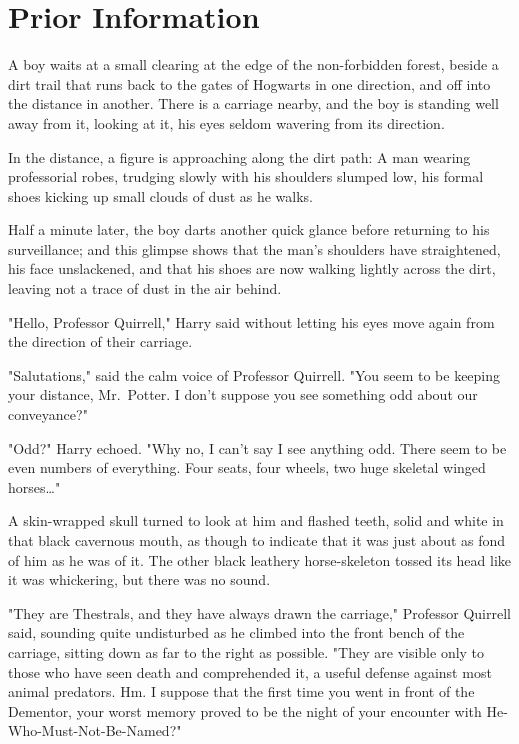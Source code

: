 \chapter{Prior Information}

\lettrine{A}{} boy waits at a
small clearing at the edge of the non-forbidden forest, beside a dirt trail
that runs back to the gates of Hogwarts in one direction, and off into the
distance in another. There is a carriage nearby, and the boy is standing well
away from it, looking at it, his eyes seldom wavering from its direction.

In the distance, a figure is approaching along the dirt path: A man wearing
professorial robes, trudging slowly with his shoulders slumped low, his formal
shoes kicking up small clouds of dust as he walks.

Half a minute later, the boy darts another quick glance before returning to his
surveillance; and this glimpse shows that the man's shoulders have
straightened, his face unslackened, and that his shoes are now walking lightly
across the dirt, leaving not a trace of dust in the air behind.

"Hello, Professor Quirrell," Harry said without letting his eyes move again
from the direction of their carriage.

"Salutations," said the calm voice of Professor Quirrell. "You seem to be
keeping your distance, Mr.~Potter. I don't suppose you see something odd about
our conveyance?"

"Odd?" Harry echoed. "Why no, I can't say I see anything odd. There seem to be
even numbers of everything. Four seats, four wheels, two huge skeletal winged
horses{\ldots}"

A skin-wrapped skull turned to look at him and flashed teeth, solid and white
in that black cavernous mouth, as though to indicate that it was just about as
fond of him as he was of it. The other black leathery horse-skeleton tossed its
head like it was whickering, but there was no sound.

"They are Thestrals, and they have always drawn the carriage," Professor
Quirrell said, sounding quite undisturbed as he climbed into the front bench of
the carriage, sitting down as far to the right as possible. "They are visible
only to those who have seen death and comprehended it, a useful defense against
most animal predators. Hm. I suppose that the first time you went in front of
the Dementor, your worst memory proved to be the night of your encounter with
He-Who-Must-Not-Be-Named?"

